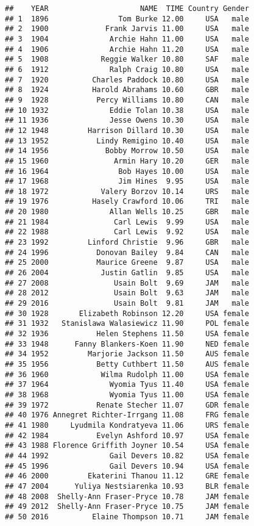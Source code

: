 \documentclass[
]{article}
\begin{document}
\begin{verbatim}
##    YEAR                     NAME  TIME Country Gender
## 1  1896                Tom Burke 12.00     USA   male
## 2  1900             Frank Jarvis 11.00     USA   male
## 3  1904              Archie Hahn 11.00     USA   male
## 4  1906              Archie Hahn 11.20     USA   male
## 5  1908            Reggie Walker 10.80     SAF   male
## 6  1912              Ralph Craig 10.80     USA   male
## 7  1920          Charles Paddock 10.80     USA   male
## 8  1924          Harold Abrahams 10.60     GBR   male
## 9  1928           Percy Williams 10.80     CAN   male
## 10 1932              Eddie Tolan 10.38     USA   male
## 11 1936              Jesse Owens 10.30     USA   male
## 12 1948         Harrison Dillard 10.30     USA   male
## 13 1952           Lindy Remigino 10.40     USA   male
## 14 1956             Bobby Morrow 10.50     USA   male
## 15 1960               Armin Hary 10.20     GER   male
## 16 1964                Bob Hayes 10.00     USA   male
## 17 1968                Jim Hines  9.95     USA   male
## 18 1972            Valery Borzov 10.14     URS   male
## 19 1976          Hasely Crawford 10.06     TRI   male
## 20 1980              Allan Wells 10.25     GBR   male
## 21 1984               Carl Lewis  9.99     USA   male
## 22 1988               Carl Lewis  9.92     USA   male
## 23 1992         Linford Christie  9.96     GBR   male
## 24 1996           Donovan Bailey  9.84     CAN   male
## 25 2000           Maurice Greene  9.87     USA   male
## 26 2004            Justin Gatlin  9.85     USA   male
## 27 2008               Usain Bolt  9.69     JAM   male
## 28 2012               Usain Bolt  9.63     JAM   male
## 29 2016               Usain Bolt  9.81     JAM   male
## 30 1928       Elizabeth Robinson 12.20     USA female
## 31 1932   Stanislawa Walasiewicz 11.90     POL female
## 32 1936           Helen Stephens 11.50     USA female
## 33 1948      Fanny Blankers-Koen 11.90     NED female
## 34 1952         Marjorie Jackson 11.50     AUS female
## 35 1956           Betty Cuthbert 11.50     AUS female
## 36 1960            Wilma Rudolph 11.00     USA female
## 37 1964              Wyomia Tyus 11.40     USA female
## 38 1968              Wyomia Tyus 11.00     USA female
## 39 1972           Renate Stecher 11.07     GDR female
## 40 1976 Annegret Richter-Irrgang 11.08     FRG female
## 41 1980     Lyudmila Kondratyeva 11.06     URS female
## 42 1984           Evelyn Ashford 10.97     USA female
## 43 1988 Florence Griffith Joyner 10.54     USA female
## 44 1992              Gail Devers 10.82     USA female
## 45 1996              Gail Devers 10.94     USA female
## 46 2000         Ekaterini Thanou 11.12     GRE female
## 47 2004      Yuliya Nestsiarenka 10.93     BLR female
## 48 2008  Shelly-Ann Fraser-Pryce 10.78     JAM female
## 49 2012  Shelly-Ann Fraser-Pryce 10.75     JAM female
## 50 2016          Elaine Thompson 10.71     JAM female
\end{verbatim}
\end{document}
